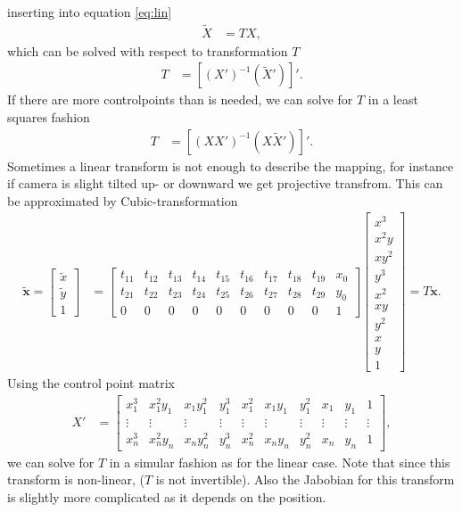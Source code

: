 \documentclass[10pt]{article}
\renewcommand{\vec}[1]{\ensuremath{\boldsymbol #1}}
\begin{document}
  inserting into equation \ref{eq:lin}
  \begin{align}
    \label{eq:lin2}
	 \tilde X &= TX,
  \end{align}
  which can be solved with respect to transformation $T$
  \begin{align}
	 T & = \left[(X')^{-1}({\tilde X}')\right]'.
  \end{align}
  If there are more controlpoints than is needed, we can solve for $T$ in a least squares fashion
  \begin{align}
	 T & = \left[(XX')^{-1}(X{\tilde X}')\right]'.
  \end{align}
 Sometimes a linear transform is not enough to describe the mapping,
 for instance if camera is slight tilted up- or downward we get projective transfrom.
 This can be approximated by Cubic-transformation
     \begin{align}
	 \tilde{\vec x} = \begin{bmatrix}\tilde x\\\tilde y\\1\end{bmatrix} &= 
	 \begin{bmatrix}
		t_{11} & t_{12} & t_{13} & t_{14} & t_{15} & t_{16} & t_{17} & t_{18} & t_{19} & x_0\\ 
		t_{21} & t_{22} & t_{23} & t_{24} & t_{25} & t_{26} & t_{27} & t_{28} & t_{29} & y_0\\
	   0 & 0& 0 & 0 & 0 & 0& 0 & 0 & 0 & 1
	 \end{bmatrix}
	 \begin{bmatrix}x^3\\x^2y\\xy^2\\y^3\\x^2\\xy\\y^2\\x\\y\\1\end{bmatrix} = T\vec x.
  \end{align}
Using the control point matrix
\begin{align}
	 X' &= \begin{bmatrix}
		x_1^3 & x_1^2y_1 & x_1y_1^2 & y_1^3 & x_1^2 & x_1y_1 & y_1^2 & x_1 & y_1 &  1 \\
	\vdots & \vdots & \vdots & \vdots & \vdots & \vdots & \vdots & \vdots & \vdots & \vdots \\
	x_n^3 & x_n^2y_n & x_ny_n^2 & y_n^3 & x_n^2 & x_ny_n & y_n^2 & x_n & y_n &  1 
	 \end{bmatrix},
\end{align}
we can solve for $T$ in a simular fashion as for the linear case. Note that since this transform
is non-linear, ($T$ is not invertible). Also the Jabobian for this transform is slightly more complicated 
as it depends on the position.
  
\end{document}
